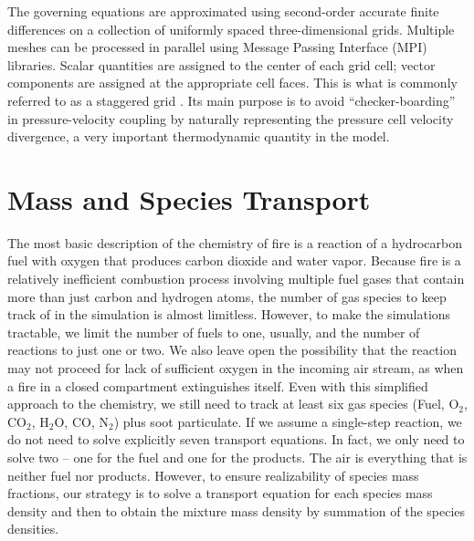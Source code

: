 The governing equations are approximated using second-order accurate finite differences on a collection of uniformly spaced three-dimensional grids. Multiple meshes can be processed in parallel using Message Passing Interface (MPI) libraries. Scalar quantities are assigned to the center of each grid cell; vector components are assigned at the appropriate cell faces. This is what is commonly referred to as a staggered grid \cite{Harlow:1,Morinishi}.  Its main purpose is to avoid ``checker-boarding'' in pressure-velocity coupling by naturally representing the pressure cell velocity divergence, a very important thermodynamic quantity in the model.

\section{Mass and Species Transport}
\label{sec_lumped_species}

The most basic description of the chemistry of fire is a reaction of a hydrocarbon fuel with oxygen that produces carbon dioxide and water vapor. Because fire is a relatively inefficient combustion process involving multiple fuel gases that contain more than just carbon and hydrogen atoms, the number of gas species to keep track of in the simulation is almost limitless. However, to make the simulations tractable, we limit the number of fuels to one, usually, and the number of reactions to just one or two. We also leave open the possibility that the reaction may not proceed for lack of sufficient oxygen in the incoming air stream, as when a fire in a closed compartment extinguishes itself. Even with this simplified approach to the chemistry, we still need to track at least six gas species (Fuel, O$_2$, CO$_2$, H$_2$O, CO, N$_2$) plus soot particulate. If we assume a single-step reaction, we do not need to solve explicitly seven transport equations. In fact, we only need to solve two -- one for the fuel and one for the products. The air is everything that is neither fuel nor products. However, to ensure realizability of species mass fractions, our strategy is to solve a transport equation for each species mass density and then to obtain the mixture mass density by summation of the species densities.

